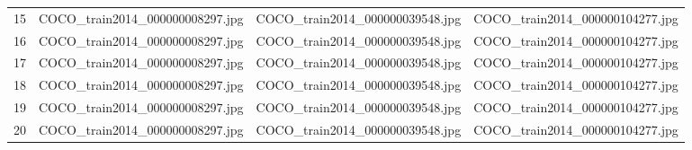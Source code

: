 \begin{table}[htb]
\begin{tabularx}{100mm}{CCCC}
        15 & COCO_train2014_000000008297.jpg & COCO_train2014_000000039548.jpg & COCO_train2014_000000104277.jpg \\
        16 & COCO_train2014_000000008297.jpg & COCO_train2014_000000039548.jpg & COCO_train2014_000000104277.jpg \\
        17 & COCO_train2014_000000008297.jpg & COCO_train2014_000000039548.jpg & COCO_train2014_000000104277.jpg \\
        18 & COCO_train2014_000000008297.jpg & COCO_train2014_000000039548.jpg & COCO_train2014_000000104277.jpg \\
        19 & COCO_train2014_000000008297.jpg & COCO_train2014_000000039548.jpg & COCO_train2014_000000104277.jpg \\
        20 & COCO_train2014_000000008297.jpg & COCO_train2014_000000039548.jpg & COCO_train2014_000000104277.jpg \\
        \hline
    \end{tabularx}
\end{table}

